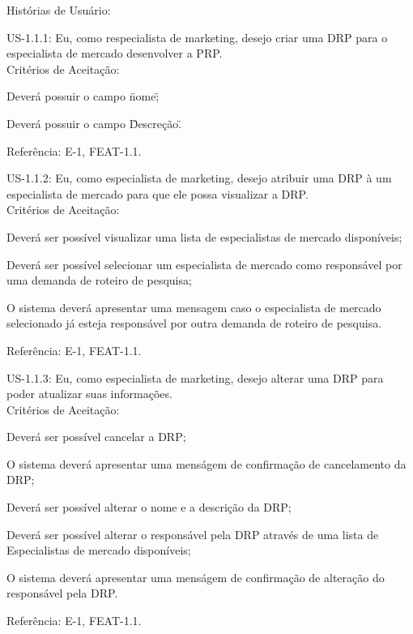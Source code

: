 			\begin{itemize}
			{
				\item Histórias de Usuário:
				\begin{itemize}
				{
					\item US-1.1.1: Eu, como respecialista de marketing, desejo criar uma DRP para o especialista de mercado desenvolver a PRP.\\
					Critérios de Aceitação:
						\begin{enumerate}
						{
							\item Deverá possuir o campo \"nome\";
							\item Deverá possuir o campo \"Descreção\".
						}
						\end{enumerate}
					Referência: E-1, FEAT-1.1.

					\item US-1.1.2: Eu, como especialista de marketing, desejo atribuir uma DRP à um especialista de mercado para que ele possa visualizar a DRP.\\
					Critérios de Aceitação:
						\begin{enumerate}
						{
							\item Deverá ser possível visualizar uma lista de especialistas de mercado disponíveis;
							\item Deverá ser possível selecionar um especialista de mercado como responsável por uma demanda de roteiro de pesquisa;
							\item O sistema deverá apresentar uma mensagem caso o especialista de mercado selecionado já esteja responsável por outra demanda de roteiro de pesquisa.
						}
						\end{enumerate}
					Referência: E-1, FEAT-1.1.

					\item US-1.1.3:  Eu, como especialista de marketing, desejo alterar uma DRP para poder atualizar suas informações.\\
					Critérios de Aceitação:
						\begin{enumerate}
						{
							\item Deverá ser possível cancelar a DRP;
							\item O sistema deverá apresentar uma menságem de confirmação de cancelamento da DRP;
							\item Deverá ser possível alterar o nome e a descrição da DRP;
							\item Deverá ser possível alterar o responsável pela DRP através de uma lista de Especialistas de mercado disponíveis;
							\item O sistema deverá apresentar uma menságem de confirmação de alteração do responsável pela DRP.
						}
						\end{enumerate}
					Referência: E-1, FEAT-1.1.

}
\end{itemize}}
\end{itemize}
